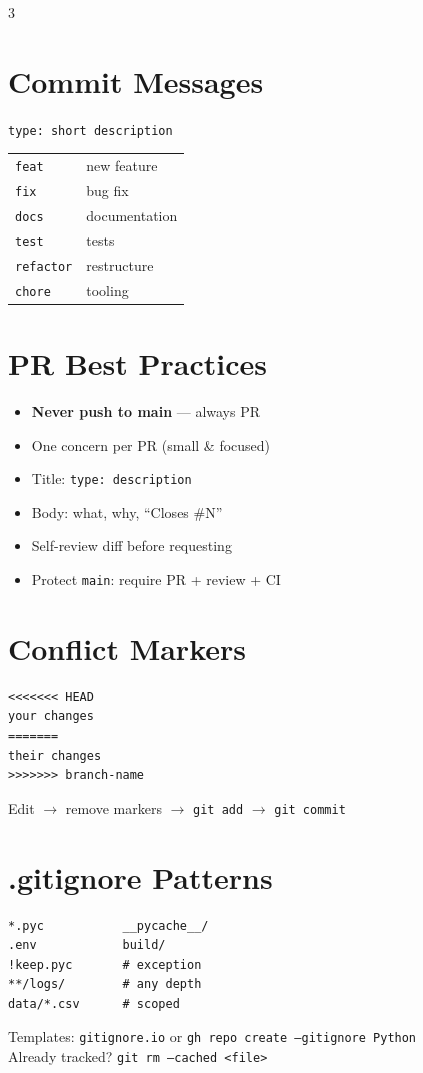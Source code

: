 \documentclass[10pt, a4paper, landscape]{article}
\begin{document}
\begin{multicols}{3}
\section{Commit Messages}
\texttt{type: short description}\\[2pt]
\begin{tabular}{@{} l l @{}}
  \texttt{feat} & new feature \\
  \texttt{fix} & bug fix \\
  \texttt{docs} & documentation \\
  \texttt{test} & tests \\
  \texttt{refactor} & restructure \\
  \texttt{chore} & tooling \\
\end{tabular}

\section{PR Best Practices}
\begin{itemize}
  \item \textbf{Never push to main} --- always PR
  \item One concern per PR (small \& focused)
  \item Title: \texttt{type: description}
  \item Body: what, why, ``Closes \#N''
  \item Self-review diff before requesting
  \item Protect \texttt{main}: require PR + review + CI
\end{itemize}

\section{Conflict Markers}
\begin{verbatim}
<<<<<<< HEAD
your changes
=======
their changes
>>>>>>> branch-name
\end{verbatim}
Edit $\to$ remove markers $\to$ \texttt{git add} $\to$ \texttt{git commit}

\section{.gitignore Patterns}
\begin{verbatim}
*.pyc           __pycache__/
.env            build/
!keep.pyc       # exception
**/logs/        # any depth
data/*.csv      # scoped
\end{verbatim}
Templates: \texttt{gitignore.io} or \texttt{gh repo create --gitignore Python}\\
Already tracked? \texttt{git rm --cached <file>}


\end{multicols}
\end{document}
